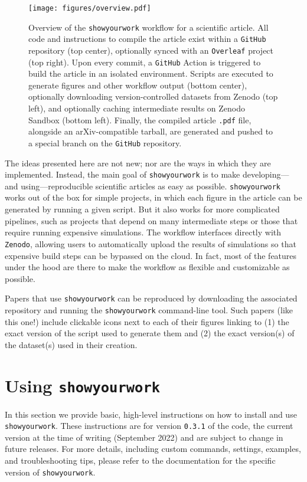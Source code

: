 \documentclass{aastex631}
\newcommand\VERSION{0.3.1}
\newcommand\MONTHYEAR{September 2022}
\newcommand\syw{\texttt{showyourwork}\xspace}
\begin{document}
\begin{figure}[t!]
    \begin{centering}
        \texttt{[image: figures/overview.pdf]}
        \caption{
            Overview of the \syw workflow for a scientific article.
            All code and instructions to compile the article exist within a \texttt{GitHub} repository (top center), optionally synced with an \texttt{Overleaf} project (top right).
            Upon every commit, a \texttt{GitHub} Action is triggered to build the article in an isolated environment.
            Scripts are executed to generate figures and other workflow output (bottom center), optionally downloading version-controlled datasets from Zenodo (top left), and optionally caching intermediate results on Zenodo Sandbox (bottom left).
            Finally, the compiled article \texttt{.pdf} file, alongside an arXiv-compatible tarball, are generated and pushed to a special branch on the \texttt{GitHub} repository.
        }
        \label{fig:overview}
    \end{centering}
\end{figure}

The ideas presented here are not new; nor are the ways in which they are implemented.
Instead, the main goal of \syw is to make developing---and using---reproducible scientific articles as easy as possible.
\syw works out of the box for simple projects, in which each figure in the article can be generated by running a given script. 
But it also works for more complicated pipelines, such as projects that depend on many intermediate steps or those that require running expensive simulations. 
The workflow interfaces directly with \texttt{Zenodo}, allowing users to automatically upload the results of simulations so that expensive build steps can be bypassed on the cloud. 
In fact, most of the features under the hood are there to make the workflow as flexible and customizable as possible.

Papers that use \syw can be reproduced by downloading the associated repository and running the \syw command-line tool. 
Such papers (like this one!) include clickable icons next to each of their figures linking to (1) the exact version of the script used to generate them and (2) the exact version(s) of the dataset(s) used in their creation.

\section{Using {\protect\syw}}
\label{sec:usage}
In this section we provide basic, high-level instructions on how to install and use \syw.
These instructions are for version \texttt{\VERSION} of the code, the current version at the time of writing (\MONTHYEAR) and are subject to change in future releases.
For more details, including custom commands, settings, examples, and troubleshooting tips, please refer to the documentation for the specific version of \syw.
\end{document}

